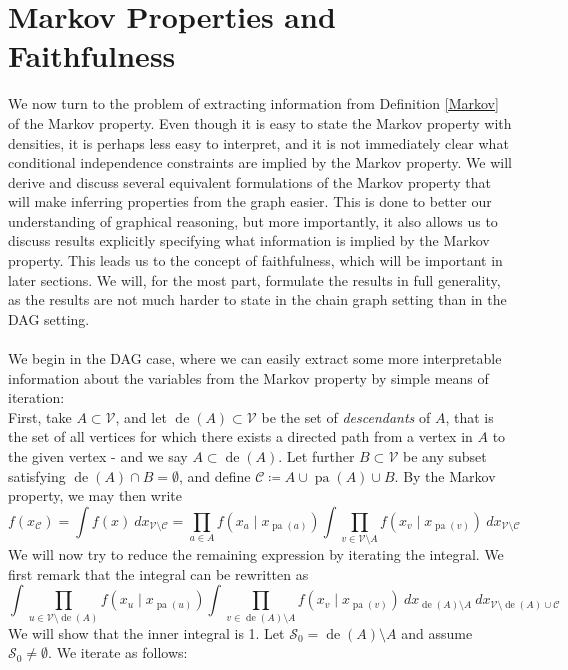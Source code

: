 \documentclass[11pt, a4paper]{memoir}
\theoremstyle{break}
\theoremstyle{break}
\theoremstyle{nonumberplain}
\DeclareMathOperator{\pa}{pa}
\DeclareMathOperator{\de}{de}
\begin{document}
\section{Markov Properties and Faithfulness}
We now turn to the problem of extracting information from Definition \ref{Markov} of the Markov property. Even though it is easy to state the Markov property with densities, it is perhaps less easy to interpret, and it is not immediately clear what conditional independence constraints are implied by the Markov property. We will derive and discuss several equivalent formulations of the Markov property that will make inferring properties from the graph easier. This is done to better our understanding of graphical reasoning, but more importantly, it also allows us to discuss results explicitly specifying what information is implied by the Markov property. This leads us to the concept of faithfulness, which will be important in later sections. We will, for the most part, formulate the results in full generality, as the results are not much harder to state in the chain graph setting than in the DAG setting.\\\\
We begin in the DAG case, where we can easily extract some more interpretable information about the variables from the Markov property by simple means of iteration:\\[5pt]
First, take $A\subset \mathcal{V}$, and let $\de(A)\subset \mathcal{V}$ be the set of \emph{descendants} of $A$, that is the set of all vertices for which there exists a directed path from a vertex in $A$ to the given vertex - and we say $A\subset \de(A)$. Let further $B\subset \mathcal{V}$ be any subset satisfying $\de(A)\cap B=\emptyset$, and define $\mathcal{C}\coloneqq A\cup\pa(A)\cup B$. By the Markov property, we may then write
$$f\left(x_{\mathcal{C}}\right)=\int f(x)\ dx_{\mathcal{V}\setminus \mathcal{C}}=\prod_{a\in A}f\left(x_{a}\mid x_{\pa(a)}\right)\int \prod_{v\in \mathcal{V}\setminus A} f\left(x_v\mid x_{\pa(v)}\right)\ dx_{\mathcal{V}\setminus \mathcal{C}}$$
We will now try to reduce the remaining expression by iterating the integral. We first remark that the integral can be rewritten as
$$\int \prod_{u\in \mathcal{V}\setminus \de(A)} f\left(x_u\mid x_{\pa(u)}\right) \int \prod_{v\in \de(A)\setminus A} f\left(x_v\mid x_{\pa(v)}\right)\ dx_{\de(A)\setminus A}\ dx_{\mathcal{V}\setminus \de(A)\cup \mathcal{C}}$$
We will show that the inner integral is 1. Let $\mathcal{S}_0=\de(A)\setminus A$ and assume $\mathcal{S}_0\neq\emptyset$. We iterate as follows:
\end{document}
